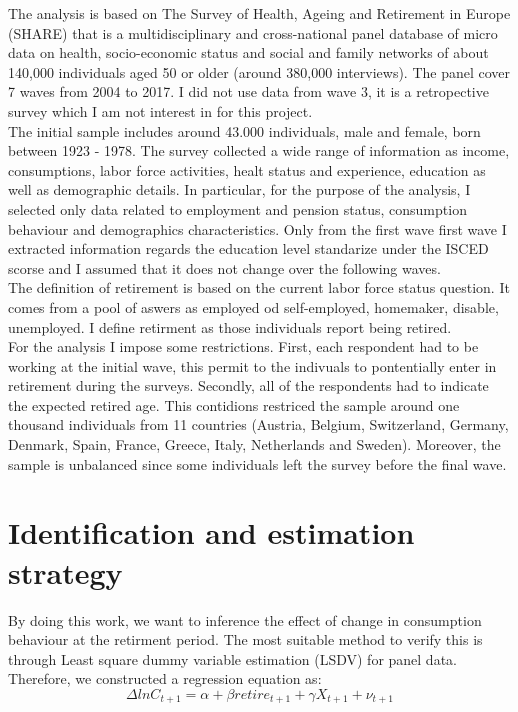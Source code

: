 \documentclass[11pt, a4paper, leqno]{article}
\begin{document}
The analysis is based on The Survey of Health, Ageing and Retirement in Europe (SHARE) that is a multidisciplinary and cross-national panel database of micro data on health, socio-economic status and social and family networks of about 140,000 individuals aged 50 or older (around 380,000 interviews). The panel cover 7 waves from 2004 to 2017. I did not use data from wave 3, it is a retropective survey which I am not interest in for this project.
\\\hspace*{4mm} The initial sample includes around 43.000 individuals, male and female, born between 1923 - 1978. The survey collected a wide range of information as income, consumptions, labor force activities, healt status and experience, education as well as demographic details. In particular, for the purpose of the analysis, I selected only data related to employment and pension status, consumption behaviour and demographics characteristics. Only from the first wave first wave I extracted information regards the education level standarize under the ISCED scorse and I assumed that it does not change over the following waves.
\\\hspace*{4mm} The definition of retirement is based on the current labor force status question. It comes from a pool of aswers as employed od self-employed, homemaker, disable, unemployed. I define retirment as those individuals report being retired.
\\\hspace*{4mm} For the analysis I impose some restrictions. First, each respondent had to be working at the initial wave, this permit to the indivuals to pontentially enter in retirement during the surveys. Secondly, all of the respondents had to indicate the expected retired age. This contidions restriced the sample around one thousand individuals from 11 countries (Austria, Belgium, Switzerland, Germany, Denmark, Spain, France, Greece, Italy, Netherlands and Sweden). Moreover, the sample is unbalanced since some individuals left the survey before the final wave.

\section{Identification and estimation strategy}
\label{sec:identification-and-estimation-strategy}

By doing this work, we want to inference the effect of change in consumption behaviour at the retirment period. The most suitable method to verify this is through Least square dummy variable estimation (LSDV) for panel data. Therefore, we constructed a regression equation as:
\setcounter{equation}{0}
	\begin{equation}
		\label{1stequation}
		\Delta ln C_{t+1} = \alpha + \beta retire_{t+1} + \gamma X_{t+1} + \nu_{t+1}
	\end{equation}
\end{document}
